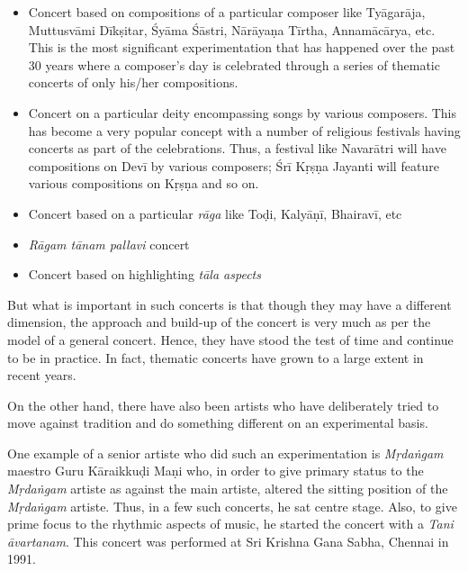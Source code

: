 \begin{itemize}
\itemsep=0pt

 \item Concert based on compositions of a particular composer like Tyāgarāja, Muttusvāmi Dīkṣitar, Śyāma Śāstri, Nārāyaṇa Tīrtha, Annamācārya, etc. This is the most significant experimentation that has happened over the past 30 years where a composer’s day is celebrated through a series of thematic concerts of only his/her compositions.

 \item Concert on a particular deity encompassing songs by various composers. This has become a very popular concept with a number of religious festivals having concerts as part of the celebrations. Thus, a festival like Navarātri will have compositions on Devī by various composers; Śrī Kṛṣṇa Jayanti will feature various compositions on Kṛṣṇa and so on.

 \item Concert based on a particular \textit{rāga} like Toḍi, Kalyāṇī, Bhairavī, etc

 \item \textit{Rāgam tānam pallavi} concert

 \item Concert based on highlighting \textit{tāla aspects}

\end{itemize}

But what is important in such concerts is that though they may have a different dimension, the approach and build-up of the concert is very much as per the model of a general concert. Hence, they have stood the test of time and continue to be in practice. In fact, thematic concerts have grown to a large extent in recent years.

On the other hand, there have also been artists who have deliberately tried to move against tradition and do something different on an experimental basis.

One example of a senior artiste who did such an experimentation is \textit{Mṛdaṅgam} maestro Guru Kāraikkuḍi Maṇi who, in order to give primary status to the \textit{Mṛdaṅgam} artiste as against the main artiste, altered the sitting position of the \textit{Mṛdaṅgam} artiste. Thus, in a few such concerts, he sat centre stage. Also, to give prime focus to the rhythmic aspects of music, he started the concert with a \textit{Tani āvartanam}. This concert was performed at Sri Krishna Gana Sabha, Chennai in 1991.

